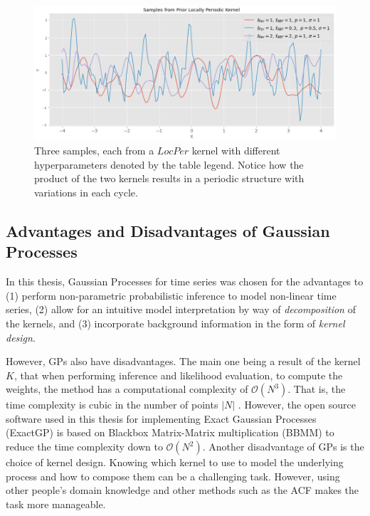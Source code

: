\begin{figure}[htp]
\centering
\graphicspath{ {./images/} }
\includegraphics[scale=0.49]{images/samples_locper_prior.png}
\caption{Three samples, each from a $LocPer$ kernel with different hyperparameters denoted by the table legend. Notice how the product of the two kernels results in a periodic structure with variations in each cycle.}
\end{figure}


\subsection{Advantages and Disadvantages of Gaussian Processes}

In this thesis, Gaussian Processes for time series was chosen for the advantages to (1) perform non-parametric probabilistic inference to model non-linear time series, (2) allow for an intuitive model interpretation by way of \textit{decomposition} of the kernels, and (3) incorporate background information in the form of \textit{kernel design}.

However, GPs also have disadvantages. The main one being a result of the kernel $K$, that when performing inference and likelihood evaluation, to compute the weights, the method has a computational complexity of $\mathcal{O}(N^3)$. That is, the time complexity is cubic in the number of points $|N|$ \cite{pml1Book}. However, the open source software used in this thesis \cite{gardner2018gpytorch} for implementing Exact Gaussian Processes (ExactGP) is based on Blackbox Matrix-Matrix multiplication (BBMM) \cite{NEURIPS2018_27e8e171} to reduce the time complexity down to $\mathcal{O}(N^2)$. Another disadvantage of GPs is the choice of kernel design. Knowing which kernel to use to model the underlying process and how to compose them can be a challenging task. However, using other people's domain knowledge and other methods such as the ACF makes the task more manageable. 

